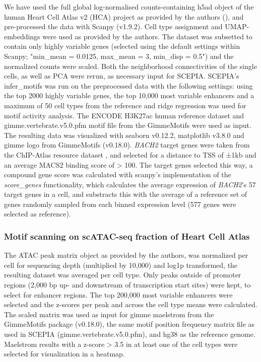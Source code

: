 We have used the full global log-normalised counts-containing h5ad object of the human Heart Cell Atlas v2 (HCA) project as provided by the authors (\cite{Kanemaru2023}), and pre-processed the data with Scanpy (v1.9.2). Cell type assignment and UMAP-embeddings were used as provided by the authors. The dataset was subsetted to contain only highly variable genes (selected using the default settings within Scanpy; "min\_mean = 0.0125, max\_mean = 3, min\_disp = 0.5") and the normalized counts were scaled. Both the neighborhood connectivities of the single cells, as well as PCA were rerun, as necessary input for SCEPIA. SCEPIA's infer\_motifs was run on the preprocessed data with the following settings: using the top 2000 highly variable genes, the top 10,000 most variable enhancers and a maximum of 50 cell types from the reference and ridge regression was used for motif activity analysis. The ENCODE H3K27ac human reference dataset and gimme.vertebrate.v5.0.pfm motif file from the GimmeMotifs were used as input. The resulting data was visualized with seaborn v0.12.2, matplotlib v3.8.0 and gimme logo from GimmeMotifs (v0.18.0). \textit{BACH2} target genes were taken from the ChIP-Atlas resource dataset \cite{Oki2018,Zou2022,BACH2_target_genes}, and selected for a distance to TSS of ±1kb and an average MACS2 binding score of > 100. The target genes selected this way, a compound gene score was calculated with scanpy's implementation of the \textit{score\_genes} functionality, which calculates the average expression of \textit{BACH2}'s 57 target genes in a cell, and substracts this with the average of a reference set of genes randomly sampled from each binned expression level (577 genes were selected as reference).

\subsubsection{Motif scanning on scATAC-seq fraction of Heart Cell Atlas}

The ATAC peak matrix object as provided by the authors, was normalized per cell for sequencing depth (multiplied by 10,000) and log1p transformed, the resulting dataset was averaged per cell type. Only peaks outside of promoter regions (2,000 bp up- and downstream of transcription start sites) were kept, to select for enhancer regions. The top 200,000 most variable enhancers were selected and the z-scores per peak and across the cell type means were calculated. The scaled matrix was used as input for gimme maelstrom from the GimmeMotifs package (v0.18.0), the same motif position frequency matrix file as used in SCEPIA (gimme.vertebrate.v5.0.pfm), and hg38 as the reference genome. Maelstrom results with a z-score > 3.5 in at least one of the cell types were selected for visualization in a heatmap.

